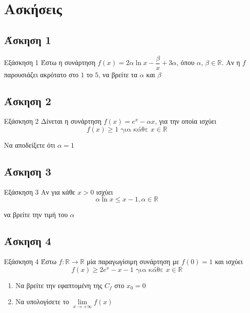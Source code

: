 \documentclass[greek]{beamer}
\begin{document}
\section{Ασκήσεις}
\subsection{Άσκηση 1}
\begin{frame}[label=Άσκηση1,t]{Εξάσκηση 1}
  Έστω η συνάρτηση $f(x)=2α\ln x-\dfrac{β}{x}+3α$, όπου $α$, $β\in\mathbb{R}$. Αν η $f$ παρουσιάζει ακρότατο στο $1$ το $5$, να βρείτε τα $α$ και $β$

\end{frame}

\subsection{Άσκηση 2}
\begin{frame}[label=Άσκηση2,t]{Εξάσκηση 2}
  Δίνεται η συνάρτηση $f(x)=e^x-αx$, για την οποία ισχύει
  $$f(x)\ge 1 \text{ για κάθε } x\in\mathbb{R}$$

  Να αποδείξετε ότι $α=1$

\end{frame}

\subsection{Άσκηση 3}
\begin{frame}[label=Άσκηση3,t]{Εξάσκηση 3}
  Αν για κάθε $x>0$ ισχύει
  $$α\ln x\le x-1,α\in\mathbb{R}$$

  να βρείτε την τιμή του $α$

\end{frame}

\subsection{Άσκηση 4}
\begin{frame}[label=Άσκηση4,t]{Εξάσκηση 4}
  Έστω $f:\mathbb{R}\to\mathbb{R}$ μία παραγωγίσιμη συνάρτηση με $f(0)=1$ και ισχύει
  $$f(x)\ge 2e^x-x-1 \text{ για κάθε } x\in\mathbb{R}$$
  \begin{enumerate}
    \item<1-> Να βρείτε την εφαπτομένη της $C_f$ στο $x_0=0$
    \item<2-> Να υπολογίσετε το $\lim\limits_{x \to +\infty}{ f(x) }$
  \end{enumerate}

\end{frame}
\end{document}
